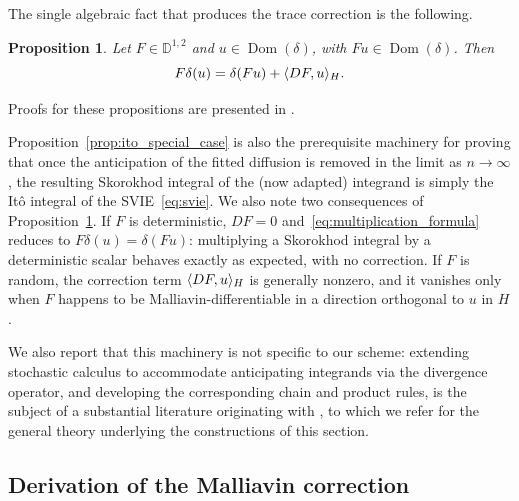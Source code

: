\documentclass[11pt, a4paper]{article}
\theoremstyle{theoremstyle}
\newtheorem{proposition}[theorem]{Proposition}
\theoremstyle{definitionstyle}
\DeclareMathOperator{\Dom}{\operatorname{Dom}}
\DeclarePairedDelimiter{\ip}{\langle}{\rangle}
\begin{document}
The single algebraic fact that produces the trace correction is the following.
\begin{proposition}\label{prop:multiplication_formula}
    Let $F\in\mathbb D^{1,2}$ and $u \in \Dom (\delta)$, with $Fu \in \Dom (\delta)$. Then
    \begin{equation}\label{eq:multiplication_formula}
        F\delta(u) = \delta(Fu) + \ip{DF,u}_H.
    \end{equation}
\end{proposition}

Proofs for these propositions are presented in \cite{nualart2006malliavin,nualartnualart2018}.

Proposition~\ref{prop:ito_special_case} is also the prerequisite machinery for proving that once the anticipation of the fitted diffusion is removed in the limit as $n \to \infty$, the resulting Skorokhod integral of the (now adapted) integrand is simply the It\^o integral of the SVIE~\eqref{eq:svie}. We also note two consequences of Proposition~\ref{prop:multiplication_formula}. If $F$ is deterministic, $DF = 0$ and~\eqref{eq:multiplication_formula} reduces to $F\delta(u) = \delta(Fu)$: multiplying a Skorokhod integral by a deterministic scalar behaves exactly as expected, with no correction. If $F$ is random, the correction term $\ip{DF,u}_H$ is generally nonzero, and it vanishes only when $F$ happens to be Malliavin-differentiable in a direction orthogonal to $u$ in $H$.

We also report that this machinery is not specific to our scheme: extending stochastic calculus to accommodate anticipating integrands via the divergence operator, and developing the corresponding chain and product rules, is the subject of a substantial literature originating with \textcite{NualartPardoux1988}, to which we refer for the general theory underlying the constructions of this section.

\subsection{Derivation of the Malliavin correction}\label{sec:malliavin_trace_derivation}
\end{document}

